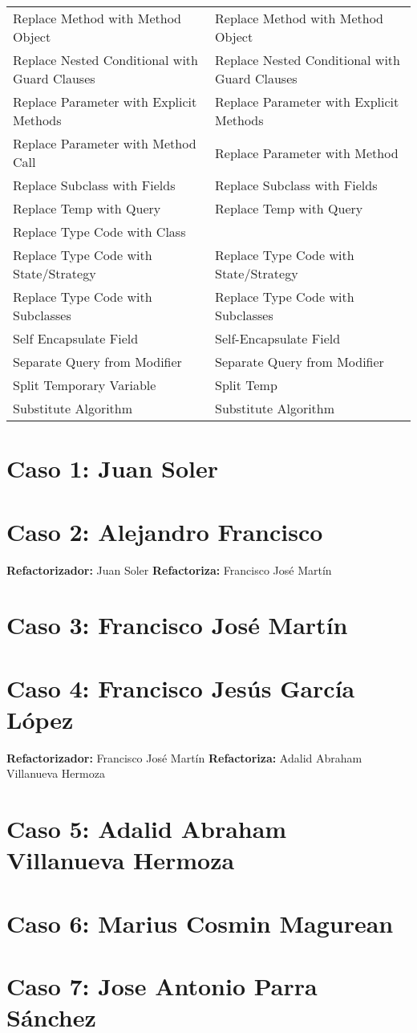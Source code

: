 \documentclass[11pt,a4paper,oneside]{book}
\begin{document}
\begin{longtable}{|p{200pt}|p{200pt}|}
    Replace Method with Method Object & Replace Method with Method Object\\ 
    Replace Nested Conditional with Guard Clauses & Replace Nested Conditional with Guard Clauses\\ 
    Replace Parameter with Explicit Methods & Replace Parameter with Explicit Methods\\ 
    Replace Parameter with Method Call & Replace Parameter with Method\\ 
    Replace Subclass with Fields & Replace Subclass with Fields\\ 
    Replace Temp with Query & Replace Temp with Query\\ 
    Replace Type Code with Class & \\ 
    Replace Type Code with State/Strategy & Replace Type Code with State/Strategy\\ 
    Replace Type Code with Subclasses & Replace Type Code with Subclasses\\ 
    Self Encapsulate Field & Self-Encapsulate Field\\ 
    Separate Query from Modifier & Separate Query from Modifier\\ 
    Split Temporary Variable & Split Temp\\ 
    Substitute Algorithm &     Substitute Algorithm\\
\end{longtable}





\chapter{Caso 1: Juan Soler}

\chapter{Caso 2: Alejandro Francisco}
\textbf{Refactorizador:} Juan Soler
\textbf{Refactoriza:} Francisco José Martín


\chapter {Caso 3: Francisco José Martín}


\chapter {Caso 4: Francisco Jesús García López}
\textbf{Refactorizador:} Francisco José Martín
\textbf{Refactoriza:} Adalid Abraham Villanueva Hermoza 



\chapter {Caso 5: Adalid Abraham Villanueva Hermoza}


\chapter {Caso 6: Marius Cosmin Magurean}

\chapter {Caso 7: Jose Antonio Parra Sánchez}
\end{document}
